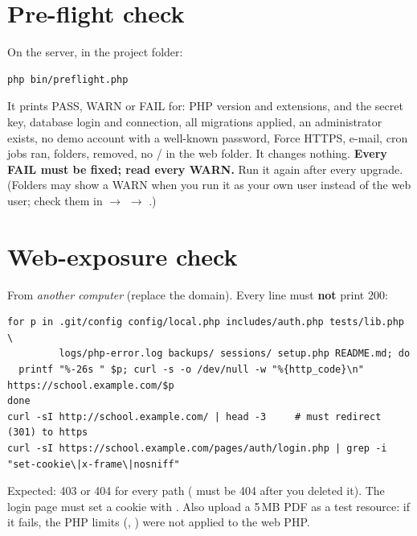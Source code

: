 \documentclass[11pt,a4paper]{article}
\begin{document}
\section{Pre-flight check}
\label{sec:preflight}
On the server, in the project folder:
\begin{lstlisting}
php bin/preflight.php
\end{lstlisting}
It prints PASS, WARN or FAIL for: PHP version and extensions,  and the secret key, database login and connection, all migrations applied, an administrator exists, no demo account with a well-known password, Force HTTPS, e-mail, cron jobs ran, folders,  removed, no / in the web folder. It changes nothing. \textbf{Every FAIL must be fixed; read every WARN.} Run it again after every upgrade. (Folders may show a WARN when you run it as your own user instead of the web user; check them in  $\rightarrow$  $\rightarrow$ .)

\section{Web-exposure check}
\label{sec:exposure}
From \emph{another computer} (replace the domain). Every line must \textbf{not} print 200:
\begin{lstlisting}
for p in .git/config config/local.php includes/auth.php tests/lib.php \
         logs/php-error.log backups/ sessions/ setup.php README.md; do
  printf "%-26s " $p; curl -s -o /dev/null -w "%{http_code}\n" https://school.example.com/$p
done
curl -sI http://school.example.com/ | head -3     # must redirect (301) to https
curl -sI https://school.example.com/pages/auth/login.php | grep -i "set-cookie\|x-frame\|nosniff"
\end{lstlisting}
Expected: 403 or 404 for every path ( must be 404 after you deleted it). The login page must set a cookie with . Also upload a 5\,MB PDF as a test resource: if it fails, the PHP limits (, ) were not applied to the web PHP.
\end{document}
